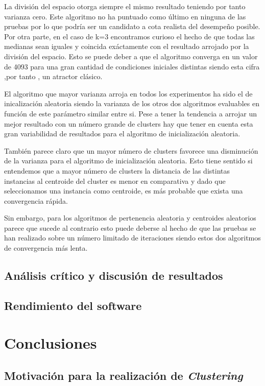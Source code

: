 \documentclass[a4paper]{report}
\begin{document}
	La división del espacio otorga siempre el mismo resultado teniendo por tanto varianza cero. Este algoritmo no ha puntuado como último en ninguna de las pruebas por lo que podría ser un candidato a cota realista del desempeño posible. Por otra parte, en el caso de k=3 encontramos curioso el hecho de que todas las medianas sean iguales y coincida exáctamente con el resultado arrojado por la división del espacio. Esto se puede deber a que el algoritmo converga en un valor de 4093 para una gran cantidad de condiciones iniciales distintas siendo esta cifra ,por tanto , un atractor clásico.

	El algoritmo que mayor varianza arroja en todos los experimentos ha sido el de inicalización aleatoria siendo la varianza de los otros dos algoritmos evaluables en función de este parámetro similar entre si. Pese a tener la tendencia a arrojar un mejor resultado con un número grande de clusters hay que tener en cuenta esta gran variabilidad de resultados para el algoritmo de inicialización aleatoria.
	
	También parece claro que un mayor número de clusters favorece una disminución de la varianza para el algoritmo de inicialización aleatoria. Esto tiene sentido si entendemos que a mayor número de clusters la distancia de las distintas instancias al centroide del cluster es menor en comparativa y dado que seleccionamos una instancia como centroide, es más probable que exista una convergencia rápida.
	
	Sin embargo, para los algoritmos de pertenencia aleatoria y centroides aleatorios parece que sucede al contrario esto puede deberse al hecho de que las pruebas se han realizado sobre un número limitado de iteraciones siendo estos dos algoritmos de convergencia más lenta.
	\section{Análisis crítico y discusión de resultados}
	
	\section{Rendimiento del software}

\chapter{Conclusiones}

	\section{Motivación para la realización de \textit{Clustering}}
	
\end{document}
